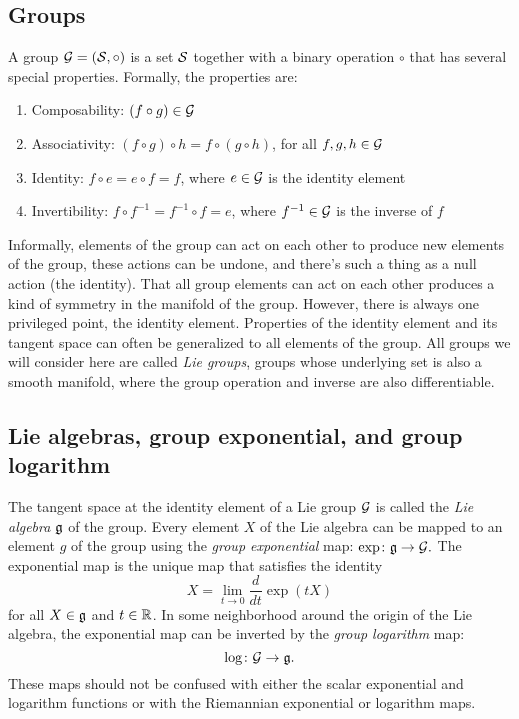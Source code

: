 \documentclass[../main.tex]{subfiles}
\begin{document}
\begin{refsection}
\subsection{Groups}\label{groups}

A group $\mathcal{G} = (\mathcal{S}, \circ)$ is a set $\mathcal{S}$ together with a binary operation $\circ$ that has several special properties.
Formally, the properties are:
\begin{enumerate}
\def\labelenumi{\arabic{enumi}.}
\item
  Composability: $(f \circ g) \in \mathcal{G}$
\item
  Associativity: $(f \circ g) \circ h = f \circ (g \circ h)$, for all $f,g,h \in \mathcal{G}$
\item
  Identity: $f \circ e = e \circ f = f$, where $e \in \mathcal{G}$ is the identity element
\item
  Invertibility: $f \circ f^{-1} = f^{-1} \circ f = e$, where $f^{-1} \in \mathcal{G}$ is the inverse of $f$
\end{enumerate}
Informally, elements of the group can act on each other to produce new elements of the group, these actions can be undone, and there's such a thing as a null action (the identity).
That all group elements can act on each other produces a kind of symmetry in the manifold of the group.
However, there is always one privileged point, the identity element.
Properties of the identity element and its tangent space can often be generalized to all elements of the group.
All groups we will consider here are called \emph{Lie groups}, groups whose underlying set is also a smooth manifold, where the group operation and inverse are also differentiable.

\subsection{Lie algebras, group exponential, and group logarithm}\label{lie-algebras-group-exponential-and-group-logarithm}

The tangent space at the identity element of a Lie group $\mathcal{G}$ is called the \emph{Lie algebra} $\mathfrak{g}$ of the group.
Every element $X$ of the Lie algebra can be mapped to an element $g$ of the group using the \emph{group exponential} map: $\exp \colon \mathfrak{g} \to \mathcal{G}.$
The exponential map is the unique map that satisfies the identity
\[X = \lim_{t \to 0} \frac{d}{dt} \exp(t X)\]
for all $X \in \mathfrak{g}$ and $t \in \mathbb{R}$.
In some neighborhood around the origin of the Lie algebra, the exponential map can be inverted by the \emph{group logarithm} map:
\[\log \colon \mathcal{G} \to \mathfrak{g}.\]
These maps should not be confused with either the scalar exponential and logarithm functions or with the Riemannian exponential or logarithm maps.


\end{refsection}
\end{document}
